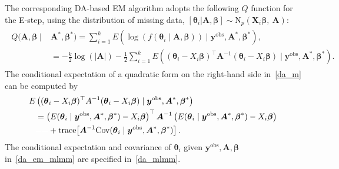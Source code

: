 \documentclass[12pt]{article}
\begin{document}
\begin{appendix}
The corresponding DA-based EM algorithm adopts the following $Q$ function for the E-step, using the distribution of missing data, $[\boldsymbol{\theta}_i\vert \boldsymbol{A}, \boldsymbol{\beta}]  \sim \textrm{N}_p(\boldsymbol{X}\!_i\boldsymbol{\beta},~ \boldsymbol{A})$:
\begin{align}
\begin{aligned}\label{da_m}
Q(\boldsymbol{A}, \boldsymbol{\beta}\mid &\boldsymbol{A}^\ast, \boldsymbol{\beta}^\ast)=\sum_{i=1}^kE(\log(f(\boldsymbol{\theta}_i\mid \boldsymbol{A}, \boldsymbol{\beta}))\mid \boldsymbol{y}^{\textrm{obs}}, \boldsymbol{A}^\ast, \boldsymbol{\beta}^\ast),\\
&=-\frac{k}{2}\log(\vert \boldsymbol{A}\vert)-\frac{1}{2}\sum_{i=1}^kE\left( (\boldsymbol{\theta}_i-X_i\boldsymbol{\beta})^\top \boldsymbol{A}^{-1}(\boldsymbol{\theta}_i-X_i\boldsymbol{\beta})\mid \boldsymbol{y}^{\textrm{obs}}, \boldsymbol{A}^\ast, \boldsymbol{\beta}^\ast\right).
\end{aligned}
\end{align}
The conditional expectation of a quadratic form on the right-hand side in~\eqref{da_m} can be computed by
\begin{align}
\begin{aligned}\label{da_em_mlmm}
E&\left( (\boldsymbol{\theta}_i-X_i\boldsymbol{\beta})^\top A^{-1}(\boldsymbol{\theta}_i-X_i\boldsymbol{\beta})\mid \boldsymbol{y}^{\textrm{obs}}, \boldsymbol{A}^\ast, \boldsymbol{\beta}^\ast\right)\\
&=\left( E(\boldsymbol{\theta}_i \mid \boldsymbol{y}^{\textrm{obs}}, \boldsymbol{A}^\ast, \boldsymbol{\beta}^\ast)-X_i\boldsymbol{\beta}\right)^\top \boldsymbol{A}^{-1}\left( E(\boldsymbol{\theta}_i\mid \boldsymbol{y}^{\textrm{obs}}, \boldsymbol{A}^\ast, \boldsymbol{\beta}^\ast)-X_i\boldsymbol{\beta}\right)\\
&\textcolor{white}{==}+\textrm{trace}\!\left[ \boldsymbol{A}^{-1}\textrm{Cov}(\boldsymbol{\theta}_i\mid \boldsymbol{y}^{\textrm{obs}}, \boldsymbol{A}^\ast, \boldsymbol{\beta}^\ast)\right].
\end{aligned}
\end{align}
The conditional expectation and covariance of $\boldsymbol{\theta}_i$ given $\boldsymbol{y}^{\textrm{obs}}, \boldsymbol{A}, \boldsymbol{\beta}$ in~\eqref{da_em_mlmm} are specified in~\eqref{da_mlmm}.


\end{appendix}
\end{document}
